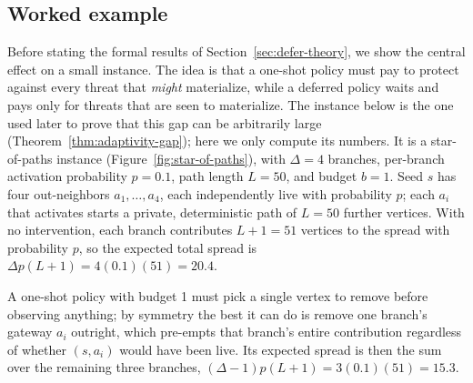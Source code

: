 \documentclass[11pt]{article}
\theoremstyle{definition}
\theoremstyle{remark}
\begin{document}
\subsection{Worked example}\label{sec:defer-example}

Before stating the formal results of Section~\ref{sec:defer-theory}, we show
the central effect on a small instance. The idea is that a one-shot policy
must pay to protect against every threat that \emph{might} materialize,
while a deferred policy waits and pays only for threats that are seen to
materialize. The instance below is the one used later to prove that this gap
can be arbitrarily large (Theorem~\ref{thm:adaptivity-gap}); here we only
compute its numbers. It is a star-of-paths instance
(Figure~\ref{fig:star-of-paths}), with $\Delta=4$ branches,
per-branch activation probability $p=0.1$, path length $L=50$, and budget
$b=1$. Seed $s$ has four out-neighbors $a_1,\dots,a_4$, each independently
live with probability $p$; each $a_i$ that activates starts a private,
deterministic path of $L=50$ further vertices. With no intervention, each
branch contributes $L+1=51$ vertices to the spread with probability $p$,
so the expected total spread is $\Delta p(L+1)=4(0.1)(51)=20.4$.

A one-shot policy with budget 1 must pick a single vertex to remove before
observing anything; by symmetry the best it can do is remove one branch's
gateway $a_i$ outright, which pre-empts that branch's entire contribution
regardless of whether $(s,a_i)$ would have been live. Its expected spread
is then the sum over the remaining three branches,
$(\Delta-1)p(L+1)=3(0.1)(51)=15.3$.
\end{document}
